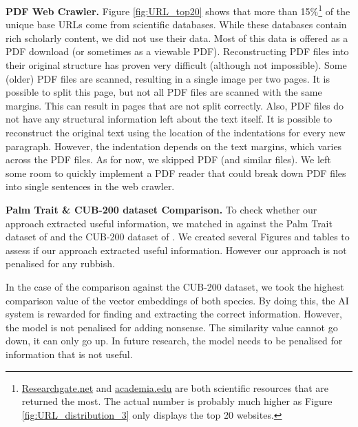 \documentclass[a4paper, 12pt, oneside]{book} %
\begin{document}
\noindent
\newline
\textbf{PDF Web Crawler.}
Figure \ref{fig:URL_top20} shows that more than 15\%\footnote{\href{https://www.researchgate.net/}{Researchgate.net} and \href{https://www.academia.edu/}{academia.edu} are both scientific resources that are returned the most. The actual number is probably much higher as Figure \ref{fig:URL_distribution_3} only displays the top 20 websites.} of the unique base URLs come from scientific databases.
While these databases contain rich scholarly content, we did not use their data.
Most of this data is offered as a PDF download (or sometimes as a viewable PDF).
Reconstructing PDF files into their original structure has proven very difficult (although not impossible).
Some (older) PDF files are scanned, resulting in a single image per two pages. 
It is possible to split this page, but not all PDF files are scanned with the same margins. 
This can result in pages that are not split correctly.
Also, PDF files do not have any structural information left about the text itself. 
It is possible to reconstruct the original text using the location of the indentations for every new paragraph.
However, the indentation depends on the text margins, which varies across the PDF files.
As for now, we skipped PDF (and similar files). 
We left some room to quickly implement a PDF reader that could break down PDF files into single sentences in the web crawler.

\noindent
\newline
\textbf{Palm Trait \& CUB-200 dataset Comparison.}
To check whether our approach extracted useful information, we matched in against the Palm Trait dataset of \textcite{kissling_palmtraits_2019} and the CUB-200 dataset of \textcite{welinder_caltech-ucsd_2010}.
We created several Figures and tables to assess if our approach extracted useful information.
However our approach is not penalised for any rubbish.

In the case of the comparison against the CUB-200 dataset, we took the highest comparison value of the vector embeddings of both species.
By doing this, the AI system is rewarded for finding and extracting the correct information.
However, the model is not penalised for adding nonsense.
The similarity value cannot go down, it can only go up.
In future research, the model needs to be penalised for information that is not useful.
\end{document}
